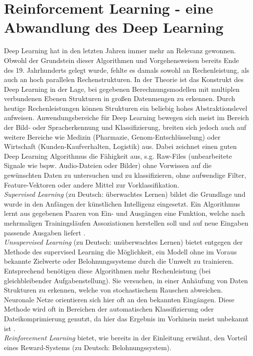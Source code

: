 \section{Reinforcement Learning - eine Abwandlung des Deep Learning}
\label{sec:rl_dl}
	Deep Learning hat in den letzten Jahren immer mehr an Relevanz gewonnen. Obwohl der Grundstein dieser Algorithmen und Vorgehensweisen bereits Ende des 19. Jahrhunderts gelegt wurde, fehlte es damals sowohl an Rechenleistung, als auch an hoch parallelen Rechenstrukturen. In der Theorie ist das Konstrukt des Deep Learning in der Lage, bei gegebenen Berechnungsmodellen mit multiplen verbundenen Ebenen Strukturen in großen Datenmengen zu erkennen. Durch heutige Rechenleistungen können Strukturen ein beliebig hohes Abstraktionslevel aufweisen. Anwendungsbereiche für Deep Learning bewegen sich meist im Bereich der Bild- oder Spracherkennung und Klassifizierung, breiten sich jedoch auch auf weitere Bereiche wie Medizin (Pharmazie, Genom-Entschlüsselung) oder Wirtschaft (Kunden-Kaufverhalten, Logistik) aus. Dabei zeichnet einen guten Deep Learning Algorithmus die Fähigkeit aus, s.g. Raw-Files (unbearbeitete Signale wie bspw. Audio-Dateien oder Bilder) ohne Vorwissen auf die gewünschten Daten zu untersuchen und zu klassifizieren, ohne aufwendige Filter, Feature-Vektoren oder andere Mittel zur Vorklassifikation.\\	
	\textit{Supervised Learning} (zu Deutsch: überwachtes Lernen) bildet die Grundlage und wurde in den Anfängen der künstlichen Intelligenz eingesetzt. Ein Algorithmus lernt aus gegebenen Paaren von Ein- und Ausgängen eine Funktion, welche nach mehrmaligen Trainingsläufen Assoziationen herstellen soll und auf neue Eingaben passende Ausgaben liefert \cite{DeepLearning}.\\
	\textit{Unsupervised Learning} (zu Deutsch: unüberwachtes Lernen) bietet entgegen der Methode des supervised Learning die Möglichkeit, ein Modell ohne im Voraus bekannte Zielwerte oder Belohnungssysteme durch die Umwelt zu trainieren. Entsprechend benötigen diese Algorithmen mehr Rechenleistung (bei gleichbleibender Aufgabenstellung). Sie versuchen, in einer Anhäufung von Daten Strukturen zu erkennen, welche von stochastischem Rauschen abweichen. Neuronale Netze orientieren sich hier oft an den bekannten Eingängen. Diese Methode wird oft in Bereichen der automatischen Klassifizierung oder Dateikomprimierung genutzt, da hier das Ergebnis im Vorhinein meist unbekannt ist \cite{DeepLearning}.\\
	\textit{Reinforcement Learning} bietet, wie bereits in der Einleitung erwähnt, den Vorteil eines Reward-Systems (zu Deutsch: Belohnungssystem).
